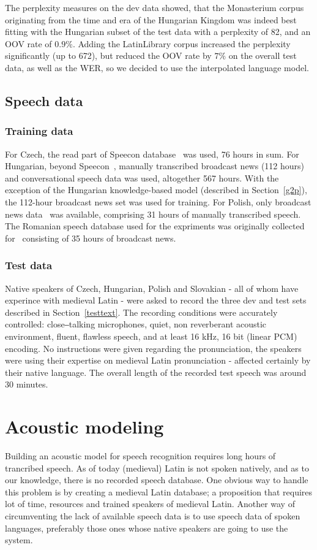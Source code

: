 \documentclass[runningheads,a4paper]{llncs}
\begin{document}
The perplexity measures on the dev data showed, that the Monasterium corpus originating from the time and era of the Hungarian Kingdom was indeed best fitting with the Hungarian subset of the test data with a perplexity of 82, and an OOV rate of $0.9\%$.
Adding the LatinLibrary corpus increased the perplexity significantly (up to 672), but reduced the OOV rate by $7\%$ on the overall test data, as well as the WER, so we decided to use the interpolated language model.

\subsection{Speech data}
\subsubsection{Training data}\label{speechtraining}
For Czech, the read part of Speecon database~\cite{czech} was used, 76 hours in sum.
For Hungarian, beyond Speecon~\cite{hungarian}, manually transcribed broadcast news (112 hours) and conversational speech data was used, altogether 567 hours.
With the exception of the Hungarian knowledge-based model (described in Section~\ref{g2p}), the 112-hour broadcast news set was used for training.
For Polish, only broadcast news data~\cite{romanian} was available, comprising 31 hours of manually transcribed speech.
The Romanian speech database used for the expriments was originally collected for~\cite{romanian} consisting of 35 hours of broadcast news.
\subsubsection{Test data}
Native speakers of Czech, Hungarian, Polish and Slovakian - all of whom have experince with medieval Latin - were asked to record the three dev and test sets described in Section~\ref{testtext}.
The recording conditions were accurately controlled: close‒talking microphones, quiet, non reverberant acoustic environment, fluent, flawless speech, and at least 16 kHz, 16 bit (linear PCM) encoding.
No instructions were given regarding the pronunciation, the speakers were using their expertise on medieval Latin pronunciation - affected certainly by their native language.
The overall length of the recorded test speech was around 30 minutes.

\section{Acoustic modeling}\label{AM}
Building an acoustic model for speech recognition requires long hours of trancribed speech.
As of today (medieval) Latin is not spoken natively, and as to our knowledge, there is no recorded speech database.
One obvious way to handle this problem is by creating a medieval Latin database; a proposition that requires lot of time, resources and trained speakers of medieval Latin. 
Another way of circumventing the lack of available speech data is to use speech data of spoken languages, preferably those ones whose native speakers are going to use the system. 
\end{document}

